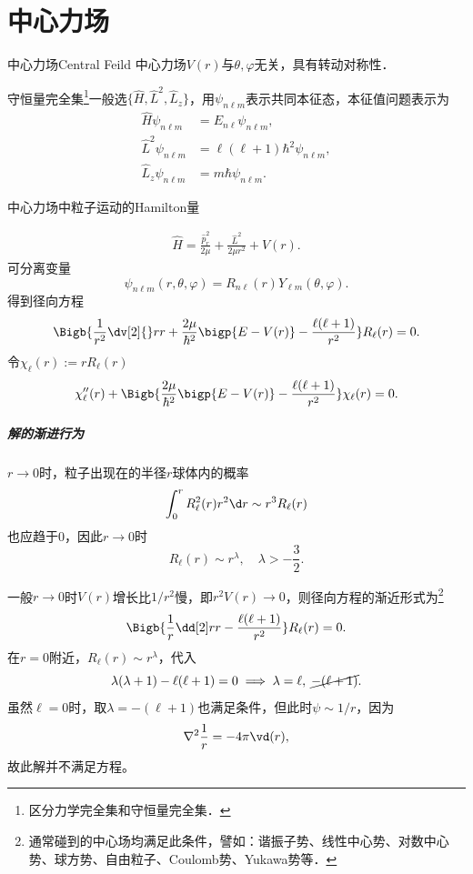 \chapter{中心力场}
\begin{definition}{中心力场}{Central Feild}
	中心力场$V(r)$与$\theta,\varphi$无关，具有转动对称性．
\end{definition}
守恒量完全集\footnote{区分力学完全集和守恒量完全集．}一般选$\{\hat H,\hat L^2,\hat L_z\}$，用$\psi_{n\ell m}$表示共同本征态，本征值问题表示为
\begin{align*}
	\hat H\psi_{n\ell m}   & =E_{n\ell}\psi_{n\ell m},           \\
	\hat L^2\psi_{n\ell m} & =\ell(\ell+1)\hbar^2\psi_{n\ell m}, \\
	\hat L_z\psi_{n\ell m} & =m\hbar\psi_{n\ell m}.
\end{align*}

中心力场中粒子运动的Hamilton量

\begin{align}
	\hat H=\frac{\hat p_r^2}{2\mu}+\frac{\hat L^2}{2\mu r^2}+V(r).
\end{align}
可分离变量
\[
	\psi_{n\ell m}(r,\theta,\varphi)=R_{n\ell}(r)Y_{\ell m}(\theta,\varphi).
\]
得到径向方程
\begin{align}
	\Bigb{\frac1{r^2}\dv[2]{}rr+\frac{2\mu}{\hbar^2}\bigp{E-V(r)}-\frac{\ell(\ell+1)}{r^2}}R_\ell(r)=0.
\end{align}
令$\chi_\ell(r):=rR_\ell(r)$
\begin{align}
	\chi''_\ell(r)+\Bigb{\frac{2\mu}{\hbar^2}\bigp{E-V(r)}-\frac{\ell(\ell+1)}{r^2}}\chi_\ell(r)=0.
\end{align}
\paragraph{解的渐进行为}
$r\to0$时，粒子出现在的半径$r$球体内的概率
\[
	\int_0^rR_\ell^2(r)r^2\d r\sim r^3R_\ell(r)
\]
也应趋于0，因此$r\to0$时
\[
R_\ell(r)\sim r^\lambda,\quad\lambda>-\frac32.
\]

一般$r\to0$时$V(r)$增长比$1/r^2$慢，即$r^2V(r)\to0$，则径向方程的渐近形式为\footnote{通常碰到的中心场均满足此条件，譬如：谐振子势、线性中心势、对数中心势、球方势、自由粒子、Coulomb势、Yukawa势等．} %
\[
	\Bigb{\frac1{r}\dd[2]rr-\frac{\ell(\ell+1)}{r^2}}R_\ell(r)=0.
\]
在$r=0$附近，$R_\ell(r)\sim r^\lambda$，代入
\[
	\lambda(\lambda+1)-\ell(\ell+1)=0\implies\lambda=\ell,\;\cancel{-(\ell+1)}.
\]
虽然$\ell=0$时，取$\lambda=-(\ell+1)$也满足条件，但此时$\psi\sim 1/r$，因为
\[
	\nabla^2\frac1r=-4\pi\vd(r),
\]
故此解并不满足\Schr 方程。
